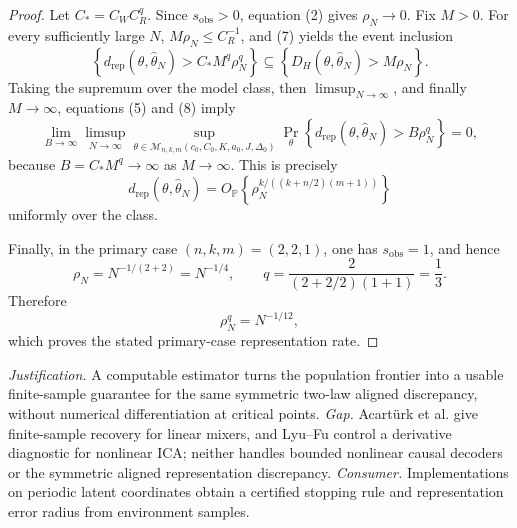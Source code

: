 \documentclass{article}
\begin{document}
\begin{proof}
Let \(C_*=C_WC_R^q\). Since \(s_{\mathrm{obs}}>0\), equation (2) gives \(\rho_N\to0\). Fix \(M>0\). For every sufficiently large \(N\), \(M\rho_N\leq C_R^{-1}\), and (7) yields the event inclusion
\[
\left\{d_{\mathrm{rep}}(\theta,\widehat\theta_N)>C_*M^q\rho_N^q\right\}
\subseteq
\left\{D_H(\theta,\widehat\theta_N)>M\rho_N\right\}.
\tag{8}
\]
Taking the supremum over the model class, then \(\limsup_{N\to\infty}\), and finally \(M\to\infty\), equations (5) and (8) imply
\[
\lim_{B\to\infty}\limsup_{N\to\infty}
\sup_{\theta\in\mathcal M_{n,k,m}(c_0,C_0,K,a_0,J,\Delta_0)}
\Pr_\theta\!\left\{
d_{\mathrm{rep}}(\theta,\widehat\theta_N)>B\rho_N^q
\right\}=0,
\tag{9}
\]
because \(B=C_*M^q\to\infty\) as \(M\to\infty\). This is precisely
\[
d_{\mathrm{rep}}(\theta,\widehat\theta_N)
=O_{\mathbb P}\!\left\{\rho_N^{k/((k+n/2)(m+1))}\right\}
\]
uniformly over the class.

Finally, in the primary case \((n,k,m)=(2,2,1)\), one has \(s_{\mathrm{obs}}=1\), and hence
\[
\rho_N=N^{-1/(2+2)}=N^{-1/4},
\qquad
q=\frac{2}{(2+2/2)(1+1)}=\frac13.
\tag{10}
\]
Therefore
\[
\rho_N^q=N^{-1/12},
\]
which proves the stated primary-case representation rate.
\end{proof}
\par\smallskip\noindent \textit{Justification.} A computable estimator turns the population frontier into a usable finite-sample guarantee for the same symmetric two-law aligned discrepancy, without numerical differentiation at critical points. \textit{Gap.} Acartürk et al. give finite-sample recovery for linear mixers, and Lyu--Fu control a derivative diagnostic for nonlinear ICA; neither handles bounded nonlinear causal decoders or the symmetric aligned representation discrepancy. \textit{Consumer.} Implementations on periodic latent coordinates obtain a certified stopping rule and representation error radius from environment samples.
\end{document}
